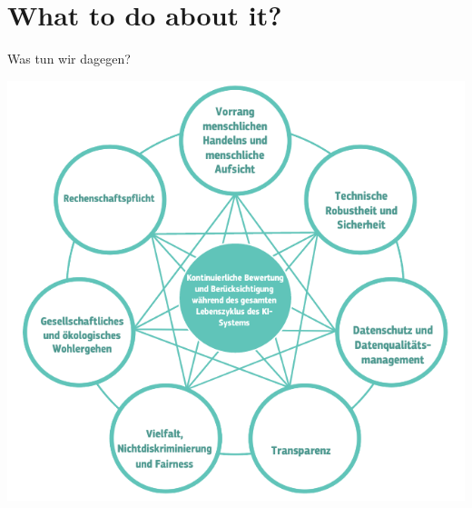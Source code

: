 \documentclass[aspectratio=169,x11names]{beamer}
\begin{document}
{
    \begin{frame}[plain]
    \end{frame}
}


\section{What to do about it?}

\begin{frame}
\begin{center}
\huge
Was tun wir dagegen?
\medskip

\includegraphics[height=0.75\paperheight,keepaspectratio]{images/eu_prinzipien} 
\end{center}
\end{frame}
\end{document}
